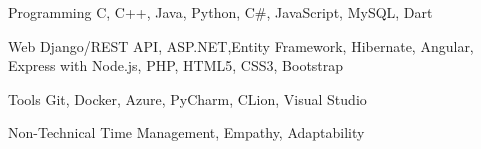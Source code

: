 
\begin{cvskills}
  \cvskill
    {Programming} %
    { C, C++,  Java, Python, C\#, JavaScript, MySQL, Dart} %

  \cvskill
    {Web} %
    {Django/REST API, ASP.NET,Entity Framework, Hibernate, Angular, Express with Node.js, PHP, HTML5, CSS3, Bootstrap} %
   
   \cvskill
    {Tools} %
    {Git, Docker, Azure, PyCharm, CLion, Visual Studio} %
    
    \cvskill
    {Non-Technical} %
    {Time Management, Empathy, Adaptability} %
    
\end{cvskills}
